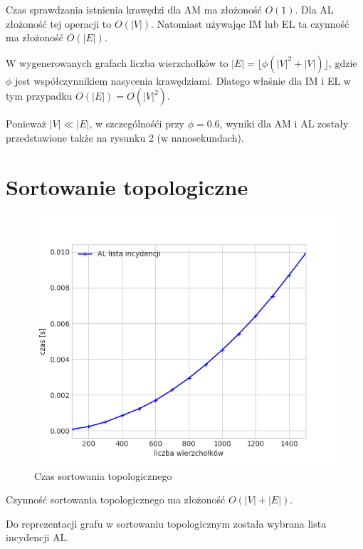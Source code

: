 \documentclass[11pt,twocolumn]{article}
\begin{document}
Czas sprawdzania istnienia krawędzi dla AM ma złożoność $O(1)$. 
Dla AL złożoność tej operacji to $O(|V|)$. 
Natomiast używając IM lub EL ta czynność ma złożoność $O(|E|)$.

W wygenerowanych grafach liczba wierzchołków to $|E|=\lfloor \phi (|V|^2+|V|) \rfloor$, 
gdzie $\phi$ jest współczynnikiem nasycenia krawędziami.
Dlatego właśnie dla IM i EL w tym przypadku $O(|E|) = O(|V|^2)$.


Ponieważ $|V| \ll |E|$, w szczególnośći przy $\phi = 0.6$, 
wyniki dla AM i AL zostały przedstawione także na rysunku 2 (w nanosekundach).

\section{Sortowanie topologiczne}

\begin{figure}[h!]
	\includegraphics[width=\linewidth]{sortuj.png}
	\caption{Czas sortowania topologicznego \label{sortuj}}
\end{figure}

Czynność sortowania topologicznego ma złożoność $O(|V|+|E|)$.

Do reprezentacji grafu w sortowaniu topologicznym została wybrana lista incydencji AL. 
\end{document}
